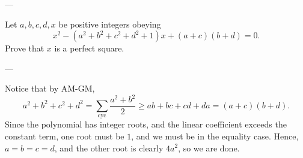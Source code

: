 
---

Let $a,b,c,d,x$ be positive integers obeying \[x^2-\left(a^2+b^2+c^2+d^2+1\right)x+(a+c)(b+d)=0.\]
Prove that $x$ is a perfect square.

---

Notice that by AM-GM, \[a^2+b^2+c^2+d^2=\sum_\mathrm{cyc}\frac{a^2+b^2}2\ge ab+bc+cd+da=(a+c)(b+d).\]
Since the polynomial has integer roots, and the linear coefficient exceeds the constant term, one root must be $1$, and we must be in the equality case. Hence, $a=b=c=d$, and the other root is clearly $4a^2$, so we are done.

